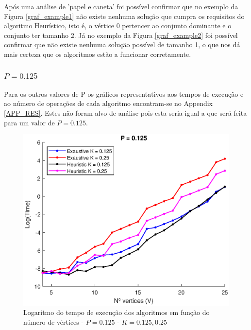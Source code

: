 \documentclass{revdetua}
\begin{document}
Após uma análise de 'papel e caneta' foi possível confirmar que no exemplo da Figura \ref{graf_example1} não existe nenhuma solução que cumpra os requisitos do algoritmo Heurístico, isto é, o vértice 0 pertencer ao conjunto dominante e o conjunto ter tamanho 2. Já no exemplo da Figura \ref{graf_example2} foi possível confirmar que não existe nenhuma solução possível de tamanho 1, o que nos dá mais certeza que os algoritmos estão a funcionar corretamente.

\subsubsection{$P = 0.125$}

Para os outros valores de P os gráficos representativos aos tempos de execução e ao número de operações de cada algoritmo encontram-se no Appendix \ref{APP_RES}. Estes não foram alvo de análise pois esta seria igual a que será feita para um valor de $P = 0.125$.

\begin{figure}[h!]
\centering
\includegraphics[scale = 0.5]{Figs/1_P0125.eps}
\caption{Logaritmo do tempo de execução dos algoritmos em função do número de vértices - $P = 0.125$ - $K = 0.125, 0.25$}
\label{1_P0125}
\end{figure}
\end{document}
